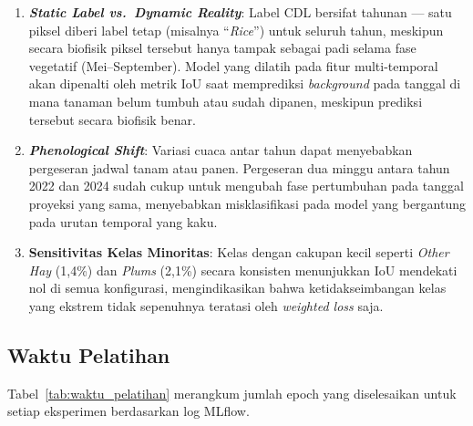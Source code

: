 \begin{enumerate}
    \item \textbf{\textit{Static Label vs.\ Dynamic Reality}}:
    Label CDL bersifat tahunan --- satu piksel diberi label tetap (misalnya ``\textit{Rice}'')
    untuk seluruh tahun, meskipun secara biofisik piksel tersebut hanya tampak sebagai padi
    selama fase vegetatif (Mei--September). Model yang dilatih pada fitur multi-temporal
    akan dipenalti oleh metrik IoU saat memprediksi \textit{background} pada tanggal di
    mana tanaman belum tumbuh atau sudah dipanen, meskipun prediksi tersebut secara
    biofisik benar.

    \item \textbf{\textit{Phenological Shift}}:
    Variasi cuaca antar tahun dapat menyebabkan pergeseran jadwal tanam atau panen.
    Pergeseran dua minggu antara tahun 2022 dan 2024 sudah cukup untuk mengubah
    fase pertumbuhan pada tanggal proyeksi yang sama, menyebabkan misklasifikasi
    pada model yang bergantung pada urutan temporal yang kaku.

    \item \textbf{Sensitivitas Kelas Minoritas}:
    Kelas dengan cakupan kecil seperti \textit{Other Hay} (1,4\%) dan \textit{Plums} (2,1\%)
    secara konsisten menunjukkan IoU mendekati nol di semua konfigurasi, mengindikasikan
    bahwa ketidakseimbangan kelas yang ekstrem tidak sepenuhnya teratasi oleh
    \textit{weighted loss} saja.
\end{enumerate}

\subsection{Waktu Pelatihan}

Tabel~\ref{tab:waktu_pelatihan} merangkum jumlah epoch yang diselesaikan untuk setiap
eksperimen berdasarkan log MLflow.

